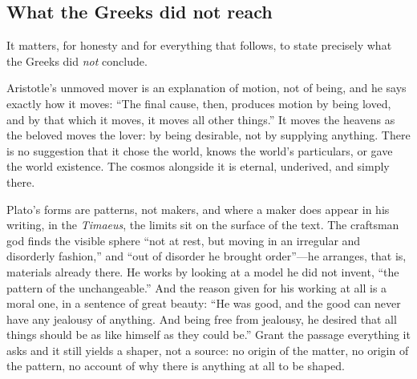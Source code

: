 \subsection{What the Greeks did not reach}

It matters, for honesty and for everything that follows, to state precisely what the Greeks did \emph{not} conclude.

Aristotle's unmoved mover is an explanation of motion, not of being, and he says exactly how it moves: ``The final cause, then, produces motion by being loved, and by that which it moves, it moves all other things.'' It moves the heavens as the beloved moves the lover: by being desirable, not by supplying anything. There is no suggestion that it chose the world, knows the world's particulars, or gave the world existence. The cosmos alongside it is eternal, underived, and simply there.

Plato's forms are patterns, not makers, and where a maker does appear in his writing, in the \emph{Timaeus}, the limits sit on the surface of the text. The craftsman god finds the visible sphere ``not at rest, but moving in an irregular and disorderly fashion,'' and ``out of disorder he brought order''---he arranges, that is, materials already there. He works by looking at a model he did not invent, ``the pattern of the unchangeable.'' And the reason given for his working at all is a moral one, in a sentence of great beauty: ``He was good, and the good can never have any jealousy of anything. And being free from jealousy, he desired that all things should be as like himself as they could be.'' Grant the passage everything it asks and it still yields a shaper, not a source: no origin of the matter, no origin of the pattern, no account of why there is anything at all to be shaped.


